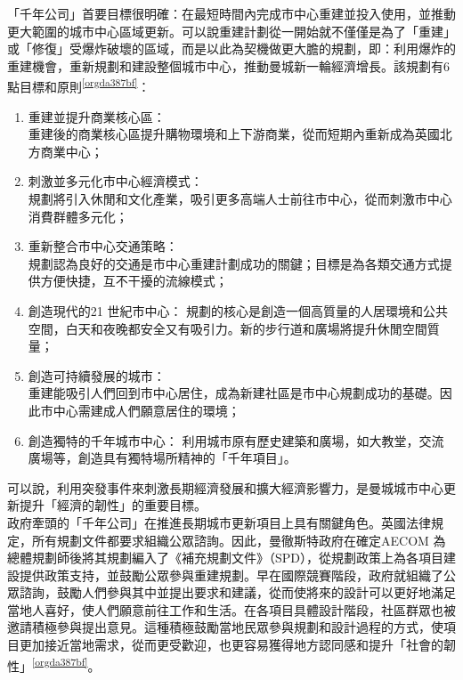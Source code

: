 \documentclass[a4paper,12pt]{article}
\begin{document}
\begin{enumerate}
「千年公司」首要目標很明確：在最短時間內完成市中心重建並投入使用，並推動更大範圍的城市中心區域更新。可以說重建計劃從一開始就不僅僅是為了「重建」或「修復」受爆炸破壞的區域，而是以此為契機做更大膽的規劃，即：利用爆炸的重建機會，重新規劃和建設整個城市中心，推動曼城新一輪經濟增長。該規劃有6 點目標和原則\textsuperscript{\ref{orgda387bf}}：\\
\begin{enumerate}
\item 重建並提升商業核心區：\\
重建後的商業核心區提升購物環境和上下游商業，從而短期內重新成為英國北方商業中心；\\
\item 刺激並多元化市中心經濟模式：\\
規劃將引入休閒和文化產業，吸引更多高端人士前往市中心，從而刺激市中心消費群體多元化；\\
\item 重新整合市中心交通策略：\\
規劃認為良好的交通是市中心重建計劃成功的關鍵；目標是為各類交通方式提供方便快捷，互不干擾的流線模式；\\
\item 創造現代的21 世紀市中心：   規劃的核心是創造一個高質量的人居環境和公共空間，白天和夜晚都安全又有吸引力。新的步行道和廣場將提升休閒空間質量；\\
\item 創造可持續發展的城市：\\
重建能吸引人們回到市中心居住，成為新建社區是市中心規劃成功的基礎。因此市中心需建成人們願意居住的環境；\\
\item 創造獨特的千年城市中心：   利用城市原有歷史建築和廣場，如大教堂，交流廣場等，創造具有獨特場所精神的「千年項目」。\\
\end{enumerate}
可以說，利用突發事件來刺激長期經濟發展和擴大經濟影響力，是曼城城市中心更新提升「經濟的韌性」的重要目標。\\

政府牽頭的「千年公司」在推進長期城市更新項目上具有關鍵角色。英國法律規定，所有規劃文件都要求組織公眾諮詢。因此，曼徹斯特政府在確定AECOM 為總體規劃師後將其規劃編入了《補充規劃文件》（SPD），從規劃政策上為各項目建設提供政策支持，並鼓勵公眾參與重建規劃。早在國際競賽階段，政府就組織了公眾諮詢，鼓勵人們參與其中並提出要求和建議，從而使將來的設計可以更好地滿足當地人喜好，使人們願意前往工作和生活。在各項目具體設計階段，社區群眾也被邀請積極參與提出意見。這種積極鼓勵當地民眾參與規劃和設計過程的方式，使項目更加接近當地需求，從而更受歡迎，也更容易獲得地方認同感和提升「社會的韌性」\textsuperscript{\ref{orgda387bf}}。\\


\end{enumerate}
\end{document}
